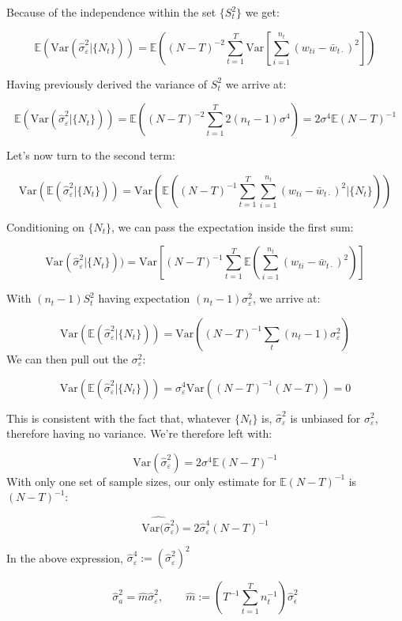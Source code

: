\documentclass{TUT}
\numberwithin{equation}{section}
\theoremstyle{plain}
\begin{document}
Because of the independence within the set $\{S_t^2\}$ we get:

$$ \mathbb{E}(\text{Var}(\hat{\sigma}_\varepsilon^2|\{N_t\})) = \mathbb{E}\left((N-T)^{-2}\sum_{t=1}^T\text{Var}\left[\sum_{i=1}^{n_t}(w_{ti}-\bar{w}_{t\cdot})^2\right]\right) $$

Having previously derived the variance of $S_t^2$ we arrive at:

$$ \mathbb{E}(\text{Var}(\hat{\sigma}_\varepsilon^2|\{N_t\})) = \mathbb{E}\left((N-T)^{-2}\sum_{t=1}^T2(n_t-1)\sigma^4\right) = 2\sigma^4\mathbb{E}(N-T)^{-1} $$

Let's now turn to the second term:

$$ \text{Var}(\mathbb{E}(\hat{\sigma}_\varepsilon^2|\{N_t\})) = \text{Var}(\mathbb{E}((N-T)^{-1}\sum_{t=1}^T\sum_{i=1}^{n_t}(w_{ti} - \bar{w}_{t\cdot})^2|\{N_t\})) $$

Conditioning on $\{N_t\}$, we can pass the expectation inside the first sum:

$$ \text{Var}(\hat{\sigma}_\varepsilon^2|\{N_t\})) = \text{Var}\left[(N-T)^{-1}\sum_{t=1}^T\mathbb{E}\left(\sum_{i=1}^{n_t}(w_{ti} - \bar{w}_{t\cdot})^2\right)\right] $$

With $(n_t-1)S_t^2$ having expectation $(n_t-1)\sigma_\varepsilon^2$, we arrive at:

$$ \text{Var}(\mathbb{E}(\hat{\sigma}_\varepsilon^2|\{N_t\})) = \text{Var}((N-T)^{-1}\sum_{t}(n_t-1)\sigma_\varepsilon^2) $$
We can then pull out the $\sigma_\varepsilon^2$:

$$ \text{Var}(\mathbb{E}(\hat{\sigma}_\varepsilon^2|\{N_t\})) = \sigma_\varepsilon^4\text{Var}((N-T)^{-1}(N-T)) = 0 $$

This is consistent with the fact that, whatever $\{N_t\}$ is, $\hat{\sigma}_\varepsilon^2$ is unbiased for $\sigma_\varepsilon^2$, therefore having no variance. We're therefore left with:

$$ \text{Var}(\hat{\sigma}_\varepsilon^2) = 2\sigma^4\mathbb{E}(N-T)^{-1} $$
With only one set of sample sizes, our only estimate for $\mathbb{E}(N-T)^{-1}$ is $(N-T)^{-1}$:


$$\widehat{\text{Var}(\hat{\sigma}_\varepsilon^2}) = 2\hat{\sigma}_\varepsilon^4{(N-T)^{-1}}$$

In the above expression, $\hat{\sigma}_\varepsilon^4:= (\hat{\sigma}_\varepsilon^2)^2$

\begin{equation}
    \hat{\sigma}_a^2 =  \hat{m}\hat{\sigma}_\varepsilon^2, \qquad \hat{m}:=\left(T^{-1}\sum_{t=1}^Tn_t^{-1}\right)\hat{\sigma}_\epsilon^2 
    \label{eq:m_hat}
\end{equation} 
\end{document}
